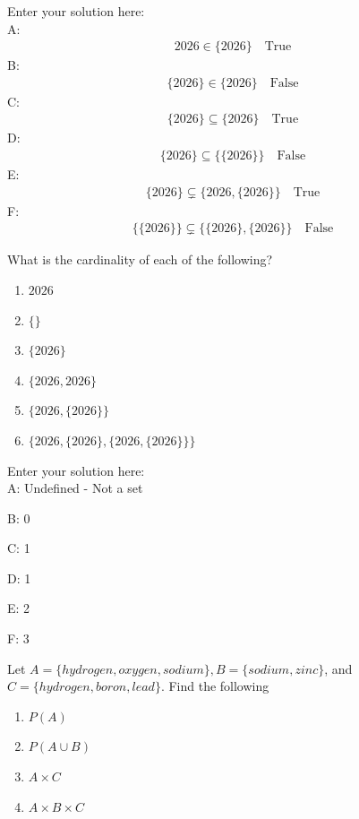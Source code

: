 \documentclass[10pt]{exam}
\begin{document}
\begin{questions}
\begin{solution}
    Enter your solution here: \\
    A: 
    \begin{align*}
    2026 \in \{2026\} \quad \text{True}
    \end{align*}
    B: 
    \begin{align*}
    \{2026\} \in \{2026\} \quad \text{False}
    \end{align*}
    C: 
    \begin{align*}
    \{2026\} \subseteq \{2026\} \quad \text{True}
    \end{align*}
    D: 
    \begin{align*}
    \{2026\} \subseteq \{\{2026\}\} \quad \text{False}
    \end{align*}
    E: 
    \begin{align*}
    \{2026\} \subsetneq \{2026, \{2026\}\} \quad \text{True}
    \end{align*}
    F: 
    \begin{align*}
    \{\{2026\}\} \subsetneq \{\{2026\}, \{2026\}\} \quad \text{False}
    \end{align*}
\end{solution}

\question[6] What is the cardinality of each of the following?
\begin{enumerate} [label=(\alph*)]
    \item $2026$
    \item $\{\}$
    \item $\{2026\}$
    \item $\{2026,2026\}$
    \item $\{2026, \{2026\}\}$
    \item $\{2026, \{2026\}, \{2026, \{2026\}\}\}$
\end{enumerate}

\begin{solution}
    Enter your solution here: \\
    A: Undefined - Not a set
    
    B: 0
    
    C: 1
    
    D: 1
    
    E: 2
    
    F: 3
\end{solution}

\question[8] Let $A = \{hydrogen, oxygen, sodium\}, B =\{sodium, zinc\}$, and $C = \{hydrogen, boron, lead\}$.  Find the following
\begin{enumerate} [label=(\alph*)]
    \item $P(A)$
    \item $P(A \cup B)$
    \item $A \times C$
    \item $A \times B \times C$
\end{enumerate}


\end{questions}
\end{document}

